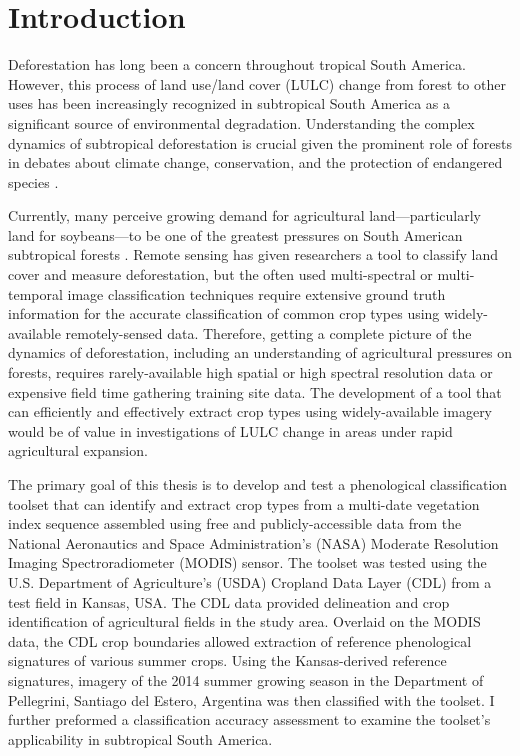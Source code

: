 \chapter{Introduction}

Deforestation has long been a concern throughout tropical South America. However, this process of land use/land cover (LULC) change from forest to other uses has been increasingly recognized in subtropical South America as a significant source of environmental degradation. Understanding the complex dynamics of subtropical deforestation is crucial given the prominent role of forests in debates about climate change, conservation, and the protection of endangered species \autocites{geist2002proximate}{zak2004do-subtropical}{bonnie2000counting}{houghton1994the-worldwide}{sala2000global}.

Currently, many perceive growing demand for agricultural land---particularly land for soybeans---to be one of the greatest pressures on South American subtropical forests \autocites{pengue2005transgenic}{grau2005agriculture}{altieri2006gm-soybean:}. Remote sensing has given researchers a tool to classify land cover and measure deforestation, but the often used multi-spectral or multi-temporal image classification techniques require extensive ground truth information for the accurate classification of common crop types using widely-available remotely-sensed data. Therefore, getting a complete picture of the dynamics of deforestation, including an understanding of agricultural pressures on forests, requires rarely-available high spatial or high spectral resolution data \autocite{senay2000using} or expensive field time gathering training site data. The development of a tool that can efficiently and effectively extract crop types using widely-available imagery would be of value in investigations of LULC change in areas under rapid agricultural expansion.

The primary goal of this thesis is to develop and test a phenological classification toolset that can identify and extract crop types from a multi-date vegetation index sequence assembled using free and publicly-accessible data from the National Aeronautics and Space Administration’s (NASA) Moderate Resolution Imaging Spectroradiometer (MODIS) sensor. The toolset was tested using the U.S. Department of Agriculture's (USDA) Cropland Data Layer (CDL) from a test field in Kansas, USA. The CDL data provided delineation and crop identification of agricultural fields in the study area. Overlaid on the MODIS data, the CDL crop boundaries allowed extraction of reference phenological signatures of various summer crops. Using the Kansas-derived reference signatures, imagery of the 2014 summer growing season in the Department of Pellegrini, Santiago del Estero, Argentina was then classified with the toolset. I further preformed a classification accuracy assessment to examine the toolset's applicability in subtropical South America.

